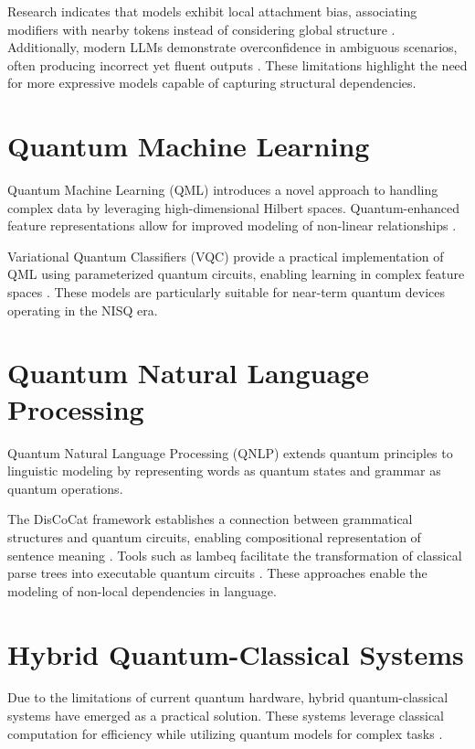Research indicates that models exhibit local attachment bias, associating modifiers with nearby tokens instead of considering global structure \cite{trustworthy2025}. Additionally, modern LLMs demonstrate overconfidence in ambiguous scenarios, often producing incorrect yet fluent outputs \cite{racquet2025}. These limitations highlight the need for more expressive models capable of capturing structural dependencies.

\section{Quantum Machine Learning}

Quantum Machine Learning (QML) introduces a novel approach to handling complex data by leveraging high-dimensional Hilbert spaces. Quantum-enhanced feature representations allow for improved modeling of non-linear relationships \cite{havlicek2019quantum}.

Variational Quantum Classifiers (VQC) provide a practical implementation of QML using parameterized quantum circuits, enabling learning in complex feature spaces \cite{schuld2020circuit,schuld2021encoding}. These models are particularly suitable for near-term quantum devices operating in the NISQ era.

\section{Quantum Natural Language Processing}

Quantum Natural Language Processing (QNLP) extends quantum principles to linguistic modeling by representing words as quantum states and grammar as quantum operations.

The DisCoCat framework establishes a connection between grammatical structures and quantum circuits, enabling compositional representation of sentence meaning \cite{coeke2020qnlp}. Tools such as lambeq facilitate the transformation of classical parse trees into executable quantum circuits \cite{kartsaklis2021lambeq}. These approaches enable the modeling of non-local dependencies in language.

\section{Hybrid Quantum-Classical Systems}

Due to the limitations of current quantum hardware, hybrid quantum-classical systems have emerged as a practical solution. These systems leverage classical computation for efficiency while utilizing quantum models for complex tasks \cite{preskill2018nisq}.

